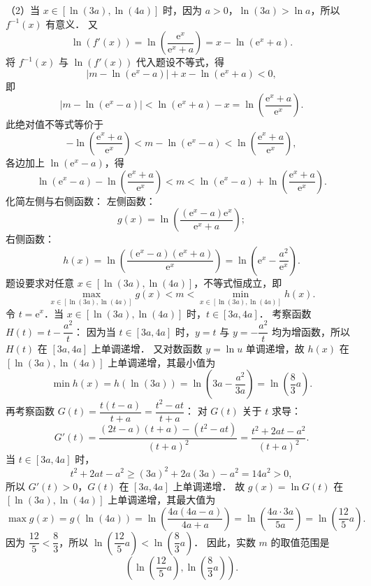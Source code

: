 \begin{answer}
（2）当 $x \in [\ln(3a), \ln(4a)]$ 时，因为 $a > 0$，$\ln(3a) > \ln a$，所以 $f^{-1}(x)$ 有意义．
又
\nopagebreak[4]
\[
\ln(f'(x)) = \ln\left(\frac{\mathrm{e}^x}{\mathrm{e}^x + a}\right) = x - \ln(\mathrm{e}^x + a).
\]
将 $f^{-1}(x)$ 与 $\ln(f'(x))$ 代入题设不等式，得
\nopagebreak[4]
\[
|m - \ln(\mathrm{e}^x - a)| + x - \ln(\mathrm{e}^x + a) < 0,
\]
即
\nopagebreak[4]
\[
|m - \ln(\mathrm{e}^x - a)| < \ln(\mathrm{e}^x + a) - x = \ln\left(\frac{\mathrm{e}^x + a}{\mathrm{e}^x}\right).
\]
此绝对值不等式等价于
\nopagebreak[4]
\[
-\ln\left(\frac{\mathrm{e}^x + a}{\mathrm{e}^x}\right) < m - \ln(\mathrm{e}^x - a) < \ln\left(\frac{\mathrm{e}^x + a}{\mathrm{e}^x}\right),
\]
各边加上 $\ln(\mathrm{e}^x - a)$，得
\nopagebreak[4]
\[
\ln(\mathrm{e}^x - a) - \ln\left(\frac{\mathrm{e}^x + a}{\mathrm{e}^x}\right) < m < \ln(\mathrm{e}^x - a) + \ln\left(\frac{\mathrm{e}^x + a}{\mathrm{e}^x}\right).
\]
化简左侧与右侧函数：
左侧函数：
\nopagebreak[4]
\[
g(x) = \ln\left(\frac{(\mathrm{e}^x - a)\mathrm{e}^x}{\mathrm{e}^x + a}\right);
\]
右侧函数：
\nopagebreak[4]
\[
h(x) = \ln\left(\frac{(\mathrm{e}^x - a)(\mathrm{e}^x + a)}{\mathrm{e}^x}\right) = \ln\left(\mathrm{e}^x - \frac{a^2}{\mathrm{e}^x}\right).
\]
题设要求对任意 $x \in [\ln(3a), \ln(4a)]$，不等式恒成立，即
\nopagebreak[4]
\[
\max_{x \in [\ln(3a), \ln(4a)]} g(x) < m < \min_{x \in [\ln(3a), \ln(4a)]} h(x).
\]
令 $t = \mathrm{e}^x$．当 $x \in [\ln(3a), \ln(4a)]$ 时，$t \in [3a, 4a]$．
考察函数 $H(t) = t - \dfrac{a^2}{t}$：
因为当 $t \in [3a, 4a]$ 时，$y = t$ 与 $y = -\dfrac{a^2}{t}$ 均为增函数，所以 $H(t)$ 在 $[3a, 4a]$ 上单调递增．
又对数函数 $y = \ln u$ 单调递增，故 $h(x)$ 在 $[\ln(3a), \ln(4a)]$ 上单调递增，其最小值为
\nopagebreak[4]
\[
\min h(x) = h(\ln(3a)) = \ln\left(3a - \frac{a^2}{3a}\right) = \ln\left(\frac{8}{3}a\right).
\]
再考察函数 $G(t) = \dfrac{t(t - a)}{t + a} = \dfrac{t^2 - at}{t + a}$：
对 $G(t)$ 关于 $t$ 求导：
\nopagebreak[4]
\[
G'(t) = \frac{(2t - a)(t + a) - (t^2 - at)}{(t + a)^2} = \frac{t^2 + 2at - a^2}{(t + a)^2}.
\]
当 $t \in [3a, 4a]$ 时，
\nopagebreak[4]
\[
t^2 + 2at - a^2 \geqslant (3a)^2 + 2a(3a) - a^2 = 14a^2 > 0,
\]
所以 $G'(t) > 0$，$G(t)$ 在 $[3a, 4a]$ 上单调递增．
故 $g(x) = \ln G(t)$ 在 $[\ln(3a), \ln(4a)]$ 上单调递增，其最大值为
\nopagebreak[4]
\[
\max g(x) = g(\ln(4a)) = \ln\left(\frac{4a(4a - a)}{4a + a}\right) = \ln\left(\frac{4a \cdot 3a}{5a}\right) = \ln\left(\frac{12}{5}a\right).
\]
因为 $\dfrac{12}{5} < \dfrac{8}{3}$，所以 $\ln\left(\dfrac{12}{5}a\right) < \ln\left(\dfrac{8}{3}a\right)$．
因此，实数 $m$ 的取值范围是
\nopagebreak[4]
\[
\left(\ln\left(\frac{12}{5}a\right), \ln\left(\frac{8}{3}a\right)\right).
\]


\end{answer}